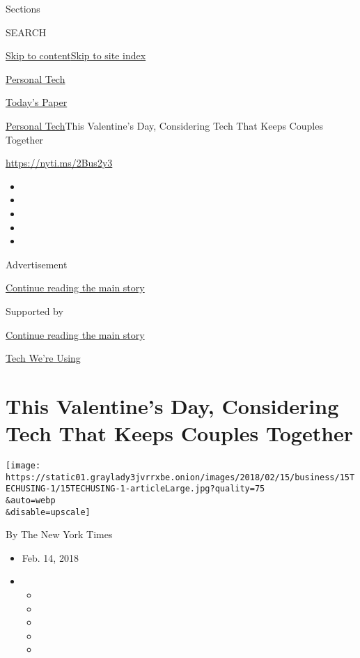 Sections

SEARCH

\protect\hyperlink{site-content}{Skip to
content}\protect\hyperlink{site-index}{Skip to site index}

\href{https://www.nytimes3xbfgragh.onion/section/technology/personaltech}{Personal
Tech}

\href{https://myaccount.nytimes3xbfgragh.onion/auth/login?response_type=cookie\&client_id=vi}{}

\href{https://www.nytimes3xbfgragh.onion/section/todayspaper}{Today's
Paper}

\href{/section/technology/personaltech}{Personal Tech}\textbar{}This
Valentine's Day, Considering Tech That Keeps Couples Together

\url{https://nyti.ms/2Bus2y3}

\begin{itemize}
\item
\item
\item
\item
\item
\end{itemize}

Advertisement

\protect\hyperlink{after-top}{Continue reading the main story}

Supported by

\protect\hyperlink{after-sponsor}{Continue reading the main story}

\href{/column/tech-we-are-using}{Tech We're Using}

\hypertarget{this-valentines-day-considering-tech-that-keeps-couples-together}{%
\section{This Valentine's Day, Considering Tech That Keeps Couples
Together}\label{this-valentines-day-considering-tech-that-keeps-couples-together}}

\texttt{[image: https://static01.graylady3jvrrxbe.onion/images/2018/02/15/business/15TECHUSING-1/15TECHUSING-1-articleLarge.jpg?quality=75\\\&auto=webp\\\&disable=upscale]}

By The New York Times

\begin{itemize}
\item
  Feb. 14, 2018
\item
  \begin{itemize}
  \item
  \item
  \item
  \item
  \item
  \end{itemize}
\end{itemize}

